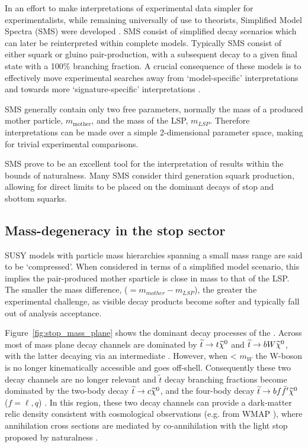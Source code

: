 In an effort to make interpretations of experimental data simpler for
experimentalists, while remaining universally of use to theorists,
Simplified Model Spectra (SMS) were developed
\cite{PhysRevD.79.075020,Alves:2011wf}.
SMS consist of simplified
decay scenarios which can later be reinterpreted within complete models.
Typically SMS consist of either squark or gluino pair-production, with a
subsequent decay to a given final state with a 100\% branching fraction.
A crucial consequence of these models is to effectively move
experimental searches away from `model-specific' interpretations and
towards more `signature-specific' interpretations \cite{PhysRevD.88.052017}.

SMS generally contain only two free parameters, normally the mass of a
produced mother particle, $m_{\text{mother}}$, and the mass of the LSP,
$m_{LSP}$. Therefore interpretations can be made over a simple 2-dimensional
parameter space, making for trivial experimental comparisons.

SMS prove to be an excellent tool for the interpretation of results
within the bounds of naturalness. Many SMS consider third generation
squark production, allowing for direct limits to be placed on the dominant
decays of stop and sbottom squarks.

\subsection{Mass-degeneracy in the stop sector}
SUSY models with particle mass hierarchies spanning a small mass range are said to be
`compressed'. When considered in terms of a simplified model scenario, this
implies the pair-produced mother sparticle is close in mass to that of the LSP.
The
smaller the mass difference, \deltam ($= m_{mother} - m_{LSP}$), the greater the
experimental challenge, as visible
decay products become softer and typically fall out of analysis acceptance.

Figure~\ref{fig:stop_mass_plane} shows the dominant decay processes of the \sTop.
Across most of mass plane decay channels are dominated by $\widetilde{t}\rightarrow t\widetilde{\chi}^{0}$ and
$\widetilde{t}\rightarrow bW\widetilde{\chi}^{0}$, with the latter decaying via an intermediate \chipm.
However, when \deltam < $m_W$ the W-boson is no longer kinematically accessible 
and goes off-shell. Consequently these two decay channels are no longer relevant and
$\tilde{t}$ decay branching fractions become
dominated by the two-body decay $\widetilde{t}\rightarrow c\widetilde{\chi}^{0}$, and the four-body decay
$\widetilde{t}\rightarrow bf\bar{f}'\widetilde{\chi}^{0}$ ($f = \ell, q$) \cite{Boehm:1999tr}. In this region, these two decay
channels can provide a dark-matter relic density consistent with cosmological
observations (e.g. from WMAP \cite{Spergel:2003cb}), where annihilation cross
sections are mediated by co-annihilation with the light stop proposed by naturalness
\cite{Balazs:2004bu,Martin:2007gf}.


